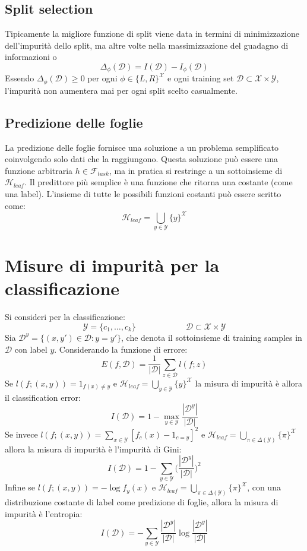 	\subsection{Split selection}
	Tipicamente la migliore funzione di split viene data in termini di minimizzazione dell'impurit\`a dello split, ma altre volte nella massimizzazione del guadagno di informazioni o
	$$\Delta_\phi(\mathcal{D})=I(\mathcal{D})-I_\phi(\mathcal{D})$$
	Essendo $\Delta_\phi(\mathcal{D})\ge 0$ per ogni $\phi\in\{L,R\}^{\mathcal{X}}$ e ogni training set $\mathcal{D}\subset\mathcal{X}\times\mathcal{Y}$, l'impurit\`a non aumentera mai per ogni split scelto casualmente.

	\subsection{Predizione delle foglie}
	La predizione delle foglie fornisce una soluzione a un problema semplificato coinvolgendo solo dati che la raggiungono.
	Questa soluzione pu\`o essere una funzione arbitraria $h\in\mathcal{F}_{task}$, ma in pratica si restringe a un sottoinsieme di $\mathcal{H}_{leaf}$.
	Il predittore pi\`u semplice \`e una funzione che ritorna una costante (come una label).
	L'insieme di tutte le possibili funzioni costanti pu\`o essere scritto come:
	$$\mathcal{H}_{leaf} = \bigcup\limits_{y\in\mathcal{Y}}\{y\}^{\mathcal{X}}$$

\section{Misure di impurit\`a per la classificazione}
Si consideri per la classificazione:
$$\mathcal{Y} = \{c_1,\dots,c_k\}\qquad\qquad\qquad\mathcal{D}\subset\mathcal{X}\times\mathcal{Y}$$
Sia $\mathcal{D}^y = \{(x, y')\in \mathcal{D}: y = y'\}$, che denota il sottoinsieme di training samples in $\mathcal{D}$ con label $y$.
Considerando la funzione di errore:
$$E(f,\mathcal{D}) = \dfrac{1}{|\mathcal{D}|}\sum\limits_{z\in\mathcal{D}}l(f;z)$$
Se $l(f;(x,y))=1_{f(x)\neq y}$ e $\mathcal{H}_{leaf} = \bigcup\limits_{y\in\mathcal{Y}}\{y\}^\mathcal{X}$ la misura di impurit\`a \`e allora il classification error:
$$I(\mathcal{D})= 1 -\max\limits_{y\in\mathcal{Y}}\dfrac{|\mathcal{D}^y|}{|\mathcal{D}|}$$
Se invece $l(f;(x,y))=\sum\limits_{x\in\mathcal{Y}}[f_c(x)-1_{c=y}]^2$ e $\mathcal{H}_{leaf}=\bigcup\limits_{\pi\in\Delta(\mathcal{Y})}\{\pi\}^\mathcal{X}$ allora la misura di impurit\`a \`e l'impurit\`a di Gini:
$$I(\mathcal{D}) = 1-\sum\limits_{y\in\mathcal{Y}}\biggl(\dfrac{|\mathcal{D}^y|}{|\mathcal{D}|}\biggr)^2$$
Infine se $l(f;(x,y))=-\log f_y(x)$ e $\mathcal{H}_{leaf} = \bigcup\limits_{\pi\in\Delta(\mathcal{Y})}\{\pi\}^\mathcal{X}$, con una distribuzione costante di label come predizione di foglie, allora la misura di impurit\`a \`e l'entropia:
$$I(\mathcal{D})=-\sum\limits_{y\in\mathcal{Y}}\dfrac{|\mathcal{D}^y|}{|\mathcal{D}|}\log\dfrac{|\mathcal{D}^y|}{|\mathcal{D}|}$$

